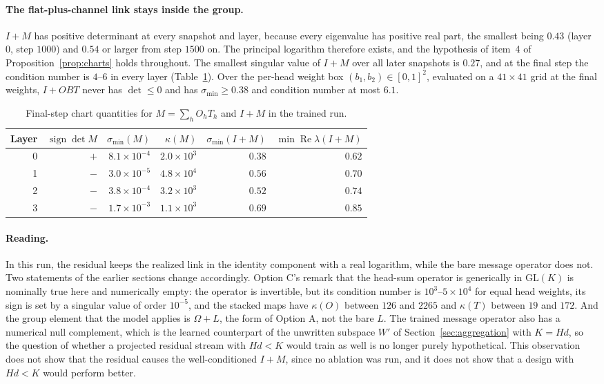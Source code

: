 \documentclass[11pt]{article}
\theoremstyle{definition}
\theoremstyle{remark}
\newcommand{\GL}{\mathrm{GL}}
\begin{document}
\paragraph{The flat-plus-channel link stays inside the group.}
$I+M$ has positive determinant at every snapshot and layer, because every eigenvalue has positive real part, the smallest being $0.43$ (layer $0$, step $1000$) and $0.54$ or larger from step $1500$ on. The principal logarithm therefore exists, and the hypothesis of item~4 of Proposition~\ref{prop:charts} holds throughout. The smallest singular value of $I+M$ over all later snapshots is $0.27$, and at the final step the condition number is $4$--$6$ in every layer (Table~\ref{tab:measured}). Over the per-head weight box $(b_1,b_2)\in[0,1]^2$, evaluated on a $41\times41$ grid at the final weights, $I+OBT$ never has $\det\le0$ and has $\sigma_{\min}\ge0.38$ and condition number at most $6.1$.

\begin{table}[ht]
\centering
\small
\begin{tabular}{rrrrrr}
\toprule
Layer & $\operatorname{sign}\det M$ & $\sigma_{\min}(M)$ & $\kappa(M)$ & $\sigma_{\min}(I+M)$ & $\min\operatorname{Re}\lambda(I+M)$ \\
\midrule
0 & $+$ & $8.1\times10^{-4}$ & $2.0\times10^{3}$ & $0.38$ & $0.62$ \\
1 & $-$ & $3.0\times10^{-5}$ & $4.8\times10^{4}$ & $0.56$ & $0.70$ \\
2 & $-$ & $3.8\times10^{-4}$ & $3.2\times10^{3}$ & $0.52$ & $0.74$ \\
3 & $-$ & $1.7\times10^{-3}$ & $1.1\times10^{3}$ & $0.69$ & $0.85$ \\
\bottomrule
\end{tabular}
\caption{Final-step chart quantities for $M=\sum_hO_hT_h$ and $I+M$ in the trained run.}
\label{tab:measured}
\end{table}

\paragraph{Reading.}
In this run, the residual keeps the realized link in the identity component with a real logarithm, while the bare message operator does not. Two statements of the earlier sections change accordingly. Option C's remark that the head-sum operator is generically in $\GL(K)$ is nominally true here and numerically empty: the operator is invertible, but its condition number is $10^3$--$5\times10^4$ for equal head weights, its sign is set by a singular value of order $10^{-5}$, and the stacked maps have $\kappa(O)$ between $126$ and $2265$ and $\kappa(T)$ between $19$ and $172$. And the group element that the model applies is $\Omega+L$, the form of Option A, not the bare $L$. The trained message operator also has a numerical null complement, which is the learned counterpart of the unwritten subspace $W'$ of Section~\ref{sec:aggregation} with $K=Hd$, so the question of whether a projected residual stream with $Hd<K$ would train as well is no longer purely hypothetical. This observation does not show that the residual causes the well-conditioned $I+M$, since no ablation was run, and it does not show that a design with $Hd<K$ would perform better.
\end{document}

